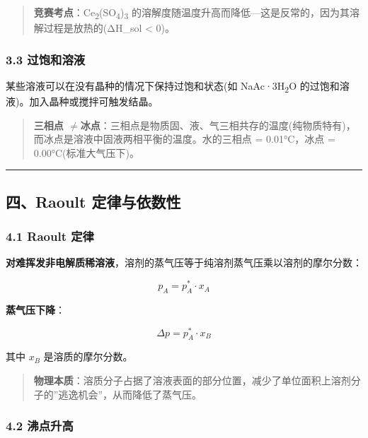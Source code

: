 \documentclass[a4paper,11pt]{ctexart}
\newcommand{\箭}{\ensuremath{\rightarrow}}
\newcommand{\左箭}{\ensuremath{\leftarrow}}
\newcommand{\上箭}{\ensuremath{\uparrow}}
\newcommand{\下箭}{\ensuremath{\downarrow}}
\newcommand{\衡}{\ensuremath{\rightleftharpoons}}
\newcommand{\双箭}{\ensuremath{\leftrightarrow}}
\newcommand{\约等于}{\ensuremath{\approx}}
\newcommand{\小于等于}{\ensuremath{\leq}}
\newcommand{\大于等于}{\ensuremath{\geq}}
\newcommand{\不等于}{\ensuremath{\neq}}
\newcommand{\西格马}{\ensuremath{\sigma}}
\newcommand{\派}{\ensuremath{\pi}}
\begin{document}
\begin{quote}
\textbf{竞赛考点}：Ce\textsubscript{2}(SO\textsubscript{4})\textsubscript{3} 的溶解度随温度升高而降低---这是反常的，因为其溶解过程是放热的(ΔH\_sol \textless{} 0)。
\end{quote}

\subsubsection{3.3 过饱和溶液}\label{ux8fc7ux9971ux548cux6eb6ux6db2}

某些溶液可以在没有晶种的情况下保持过饱和状态(如 NaAc·3H\textsubscript{2}O 的过饱和溶液)。加入晶种或搅拌可触发结晶。

\begin{quote}
\textbf{三相点 \不等于 冰点}：三相点是物质固、液、气三相共存的温度(纯物质特有)，而冰点是溶液中固液两相平衡的温度。水的三相点 = 0.01°C，冰点 = 0.00°C(标准大气压下)。
\end{quote}

\begin{center}\rule{0.5\linewidth}{0.5pt}\end{center}

\subsection{四、Raoult 定律与依数性}\label{ux56dbraoult-ux5b9aux5f8bux4e0eux4f9dux6570ux6027}

\subsubsection{4.1 Raoult 定律}\label{raoult-ux5b9aux5f8b}

\textbf{对难挥发非电解质稀溶液}，溶剂的蒸气压等于纯溶剂蒸气压乘以溶剂的摩尔分数：

\[
\boxed{p_A = p_A^* \cdot x_A}
\]

\textbf{蒸气压下降}：

\[
\boxed{\Delta p = p_A^* \cdot x_B}
\]

其中 \(x_B\) 是溶质的摩尔分数。

\begin{quote}
\textbf{物理本质}：溶质分子占据了溶液表面的部分位置，减少了单位面积上溶剂分子的''逃逸机会''，从而降低了蒸气压。
\end{quote}

\subsubsection{4.2 沸点升高}\label{ux6cb8ux70b9ux5347ux9ad8}
\end{document}
